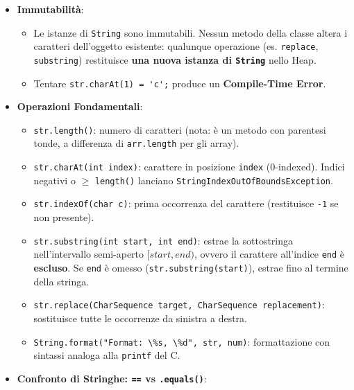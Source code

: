 \documentclass[11pt,a4paper,oneside]{report}
\newcommand{\passthrough}[1]{#1}
\providecommand{\tightlist}{\setlength{\itemsep}{0pt}\setlength{\parskip}{0pt}}
\begin{document}
\begin{itemize}
\tightlist
\item
  \textbf{Immutabilità}:

  \begin{itemize}
  \tightlist
  \item
    Le istanze di \passthrough{\lstinline!String!} sono immutabili.
    Nessun metodo della classe altera i caratteri dell'oggetto
    esistente: qualunque operazione (es.
    \passthrough{\lstinline!replace!},
    \passthrough{\lstinline!substring!}) restituisce \textbf{una nuova
    istanza di \passthrough{\lstinline!String!}} nello Heap.
  \item
    Tentare \passthrough{\lstinline!str.charAt(1) = 'c';!} produce un
    \textbf{Compile-Time Error}.
  \end{itemize}
\item
  \textbf{Operazioni Fondamentali}:

  \begin{itemize}
  \tightlist
  \item
    \passthrough{\lstinline!str.length()!}: numero di caratteri (nota: è
    un metodo con parentesi tonde, a differenza di
    \passthrough{\lstinline!arr.length!} per gli array).
  \item
    \passthrough{\lstinline!str.charAt(int index)!}: carattere in
    posizione \passthrough{\lstinline!index!} (0-indexed). Indici
    negativi o \(\ge\) \passthrough{\lstinline!length()!} lanciano
    \passthrough{\lstinline!StringIndexOutOfBoundsException!}.
  \item
    \passthrough{\lstinline!str.indexOf(char c)!}: prima occorrenza del
    carattere (restituisce \passthrough{\lstinline!-1!} se non
    presente).
  \item
    \passthrough{\lstinline!str.substring(int start, int end)!}: estrae
    la sottostringa nell'intervallo semi-aperto \([start, end)\), ovvero
    il carattere all'indice \passthrough{\lstinline!end!} è
    \textbf{escluso}. Se \passthrough{\lstinline!end!} è omesso
    (\passthrough{\lstinline!str.substring(start)!}), estrae fino al
    termine della stringa.
  \item
    \passthrough{\lstinline!str.replace(CharSequence target, CharSequence replacement)!}:
    sostituisce tutte le occorrenze da sinistra a destra.
  \item
    \passthrough{\lstinline!String.format("Format: \%s, \%d", str, num)!}:
    formattazione con sintassi analoga alla
    \passthrough{\lstinline!printf!} del C.
  \end{itemize}
\item
  \textbf{Confronto di Stringhe: \passthrough{\lstinline!==!} vs
  \passthrough{\lstinline!.equals()!}}:


\end{itemize}
\end{document}
